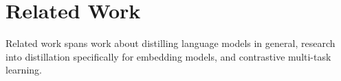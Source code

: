 \documentclass[11pt]{article}
\begin{document}




\section{Related Work}
\label{sec:related_work}

Related work spans work about distilling language models in general, research into distillation specifically for embedding models, and contrastive multi-task learning.
\end{document}
